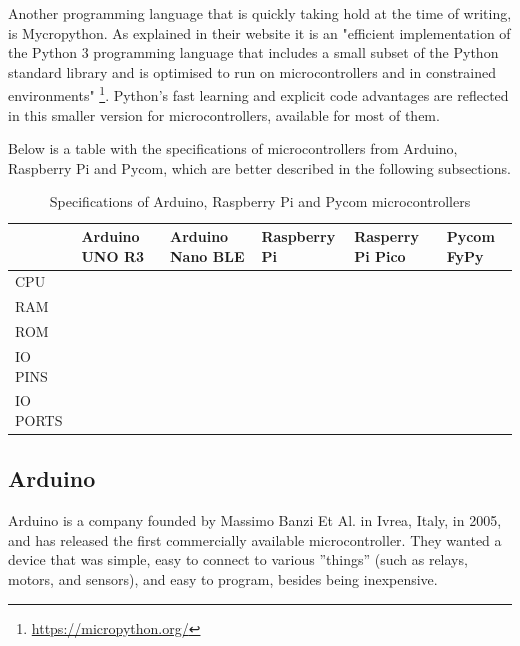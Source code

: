 	Another programming language that is quickly taking hold at the time of writing, is Mycropython.
	As explained in their website it is an "efficient implementation of the Python 3 programming language that includes a small subset of the Python standard library and is optimised to run on microcontrollers and in constrained environments" \footnote{\url{https://micropython.org/}}.
	Python's fast learning and explicit code advantages are reflected in this smaller version for microcontrollers, available for most of them.
	
	Below is a table with the specifications of microcontrollers from Arduino, Raspberry Pi and Pycom, which are better described in the following subsections.
	\begin{table}[htbp]
		\begin{center}
			\begin{tabularx}{\textwidth}{@{}|Y|Y|Y|Y|Y|Y|@{}} 
				\hline
				& Arduino UNO R3 & Arduino Nano BLE & Raspberry Pi & Rasperry Pi Pico & Pycom FyPy \\\hline
					CPU &&&&& \\\hline
					RAM &&&&& \\\hline
					ROM &&&&& \\\hline
					IO PINS &&&&& \\\hline
					IO PORTS &&&&& \\\hline
			\end{tabularx}
			\caption{Specifications of Arduino, Raspberry Pi and Pycom microcontrollers}
			\label{table:1}
		\end{center}
	\end{table}

	\subsection{Arduino}\label{subsec:arduino}
	
		Arduino is a company founded by Massimo Banzi Et Al. in Ivrea, Italy, in 2005, and has released the first commercially available microcontroller.
		They wanted a device that was simple, easy to connect to various ''things'' (such as relays, motors, and sensors), and easy to program, besides being inexpensive.
	
